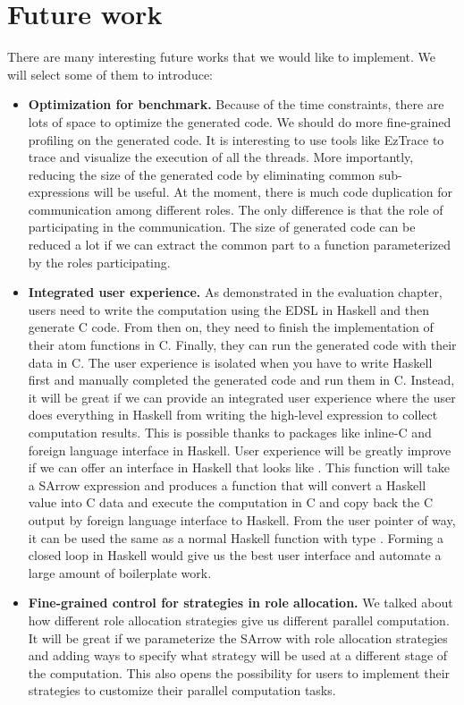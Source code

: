 \section{Future work}
There are many interesting future works that we would like to implement. We will select some of them to introduce:
\begin{itemize}
    \item \textbf{Optimization for benchmark.} Because of the time constraints, there are lots of space to optimize the generated code. We should do more fine-grained profiling on the generated code. It is interesting to use tools like EzTrace to trace and visualize the execution of all the threads. More importantly, reducing the size of the generated code by eliminating common sub-expressions will be useful. At the moment, there is much code duplication for communication among different roles. The only difference is that the role of participating in the communication. The size of generated code can be reduced a lot if we can extract the common part to a function parameterized by the roles participating. 
    \item \textbf{Integrated user experience.} As demonstrated in the evaluation chapter, users need to write the computation using the EDSL in Haskell and then generate C code. From then on, they need to finish the implementation of their atom functions in C. Finally, they can run the generated code with their data in C. The user experience is isolated when you have to write Haskell first and manually completed the generated code and run them in C. Instead, it will be great if we can provide an integrated user experience where the user does everything in Haskell from writing the high-level expression to collect computation results. This is possible thanks to packages like inline-C and foreign language interface in Haskell. User experience will be greatly improve if we can offer an interface in Haskell that looks like . This function will take a SArrow expression and produces a function that will convert a Haskell value into C data and execute the computation in C and copy back the C output by foreign language interface to Haskell. From the user pointer of way, it can be used the same as a normal Haskell function with type . Forming a closed loop in Haskell would give us the best user interface and automate a large amount of boilerplate work.
    \item \textbf{Fine-grained control for strategies in role allocation.} We talked about how different role allocation strategies give us different parallel computation. It will be great if we parameterize the SArrow with role allocation strategies and adding ways to specify what strategy will be used at a different stage of the computation. This also opens the possibility for users to implement their strategies to customize their parallel computation tasks.

\end{itemize}
